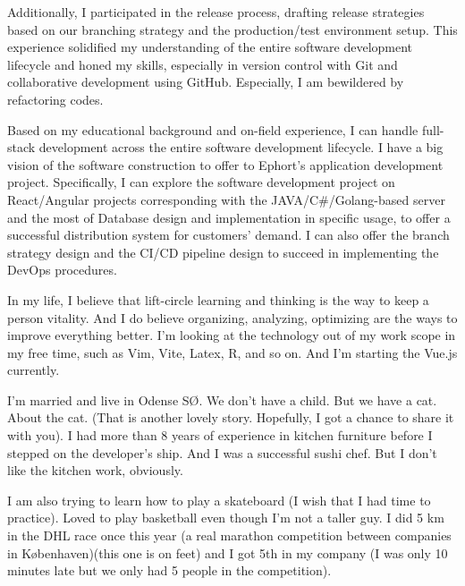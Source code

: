\documentclass[a4paper]{article}
\begin{document}
\vspace{0.5em}
\hspace{1em}Additionally, I participated in the release process, drafting release strategies based on our branching strategy and the production/test environment setup. This experience solidified my understanding of the entire software development lifecycle and honed my skills, especially in version control with Git and collaborative development using GitHub. Especially, I am bewildered by refactoring codes.

\vspace{0.5em}
\hspace{1em}Based on my educational background and on-field experience, I can handle full-stack development across the entire software development lifecycle. I have a big vision of the software construction to offer to Ephort’s application development project. Specifically, I can explore the software development project on React/Angular projects corresponding with the JAVA/C\#/Golang-based server and the most of Database design and implementation in specific usage, to offer a successful distribution system for customers' demand. I can also offer the branch strategy design and the CI/CD pipeline design to succeed in implementing the DevOps procedures.

\vspace{0.5em}
\hspace{1em}In my life, I believe that lift-circle learning and thinking is the way to keep a person vitality. And I do believe organizing, analyzing, optimizing are the ways to improve everything better. I’m looking at the technology out of my work scope in my free time, such as Vim, Vite, Latex, R, and so on. And I’m starting the Vue.js currently.

\vspace{0.5em}
\hspace{1em}I’m married and live in Odense SØ. We don’t have a child. But we have a cat. About the cat. (That is another lovely story. Hopefully, I got a chance to share it with you). I had more than 8 years of experience in kitchen furniture before I stepped on the developer’s ship. And I was a successful sushi chef. But I don’t like the kitchen work, obviously.

\vspace{0.5em}
\hspace{1em}I am also trying to learn how to play a skateboard (I wish that I had time to practice). Loved to play basketball even though I’m not a taller guy. I did 5 km in the DHL race once this year (a real marathon competition between companies in Københaven)(this one is on feet) and I got 5th in my company (I was only 10 minutes late but we only had 5 people in the competition). 
\end{document}
